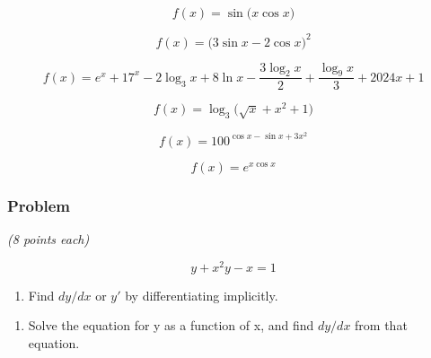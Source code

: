 \documentclass[
  letterpaper,
  DIV=11,
  numbers=noendperiod]{scrartcl}
\providecommand{\tightlist}{%
  \setlength{\itemsep}{0pt}\setlength{\parskip}{0pt}}\usepackage{longtable,booktabs,array}
\begin{document}
\thispagestyle{empty}

\[f(x) = \sin\bigg(x \cos x\bigg)\]

\[f(x) = \bigg(3\sin x - 2\cos x\bigg)^{2}\]

\hfill\break
\hfill\break
\hfill\break
\hfill\break
\hfill\break

\[f(x) = e^x +17^x - 2\log_{3}x + 8\ln x - \frac{3\log_2 x}{2} + \frac{\log_9 x}{3} + 2024x + 1\]

\hfill\break
\hfill\break
\hfill\break
\hfill\break
\hfill\break

\[f(x) = \log_{3}\bigg(\sqrt{x}+x^2+1\bigg)\]

\hfill\break
\hfill\break
\hfill\break
\hfill\break
\hfill\break

\thispagestyle{empty}

\[f(x) = 100^{\cos x - \sin x + 3x^2}\]

\hfill\break
\hfill\break
\hfill\break
\hfill\break

\[f(x) = e^{x\cos x}\]

\subsubsection{Problem}\label{problem-5}

\emph{(8 points each)}

\[
y + x^2y - x = 1
\]

\begin{enumerate}
\def\labelenumi{(\alph{enumi})}
\tightlist
\item
  Find \(dy/dx\) or \(y'\) by differentiating implicitly.
\end{enumerate}

\hfill\break
\hfill\break
\hfill\break
\hfill\break
\hfill\break
\hfill\break
\hfill\break
\hfill\break
\hfill\break
\hfill\break
\hfill\break
\hfill\break
\hfill\break

\begin{enumerate}
\def\labelenumi{(\alph{enumi})}
\setcounter{enumi}{1}
\tightlist
\item
  Solve the equation for y as a function of x, and find \(dy/dx\) from
  that equation.
\end{enumerate}

\thispagestyle{empty}

\hfill\break
\hfill\break
\hfill\break
\hfill\break
\hfill\break
\hfill\break
\hfill\break
\hfill\break
\hfill\break
\hfill\break
\hfill\break
\hfill\break
\hfill\break
\hfill\break
\hfill\break
\hfill\break
\end{document}
